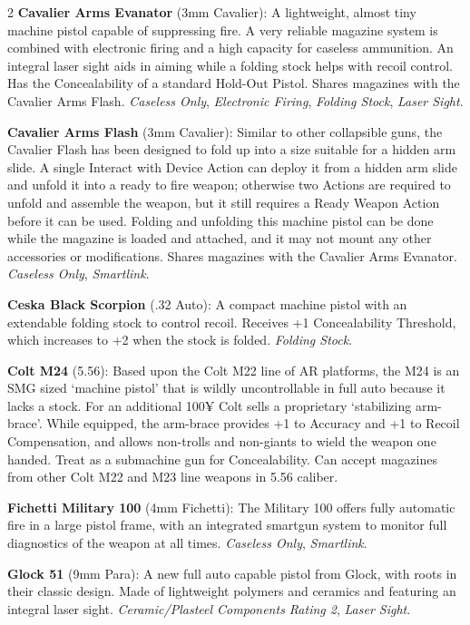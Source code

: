 \documentclass[
  oneside]{article}
\begin{document}
\begin{multicols}{2}
\textbf{Cavalier Arms Evanator} (3mm Cavalier): A
lightweight, almost tiny machine pistol capable of
suppressing fire. A very reliable magazine system
is combined with electronic firing and a high
capacity for caseless ammunition. An integral
laser sight aids in aiming while a folding stock
helps with recoil control. Has the Concealability
of a standard Hold-Out Pistol. Shares magazines
with the Cavalier Arms Flash. \emph{Caseless
Only}, \emph{Electronic Firing}, \emph{Folding
Stock}, \emph{Laser Sight}.

\textbf{Cavalier Arms Flash} (3mm Cavalier):
Similar to other collapsible guns, the Cavalier
Flash has been designed to fold up into a size
suitable for a hidden arm slide. A single Interact
with Device Action can deploy it from a hidden arm
slide and unfold it into a ready to fire weapon;
otherwise two Actions are required to unfold and
assemble the weapon, but it still requires a Ready
Weapon Action before it can be used. Folding and
unfolding this machine pistol can be done while
the magazine is loaded and attached, and it may
not mount any other accessories or modifications.
Shares magazines with the Cavalier Arms Evanator.
\emph{Caseless Only}, \emph{Smartlink}.

\textbf{Ceska Black Scorpion} (.32 Auto): A
compact machine pistol with an extendable folding
stock to control recoil. Receives +1
Concealability Threshold, which increases to +2
when the stock is folded. \emph{Folding Stock}.

\textbf{Colt M24} (5.56): Based upon the Colt M22
line of AR platforms, the M24 is an SMG sized
`machine pistol' that is wildly uncontrollable in
full auto because it lacks a stock. For an
additional 100¥ Colt sells a proprietary
`stabilizing arm-brace'. While equipped, the
arm-brace provides +1 to Accuracy and +1 to Recoil
Compensation, and allows non-trolls and non-giants
to wield the weapon one handed. Treat as a
submachine gun for Concealability. Can accept
magazines from other Colt M22 and M23 line weapons
in 5.56 caliber.

\textbf{Fichetti Military 100} (4mm Fichetti): The
Military 100 offers fully automatic fire in a
large pistol frame, with an integrated smartgun
system to monitor full diagnostics of the weapon
at all times. \emph{Caseless Only},
\emph{Smartlink}.

\textbf{Glock 51} (9mm Para): A new full auto
capable pistol from Glock, with roots in their
classic design. Made of lightweight polymers and
ceramics and featuring an integral laser sight.
\emph{Ceramic/Plasteel Components Rating 2},
\emph{Laser Sight}.


\end{multicols}
\end{document}
